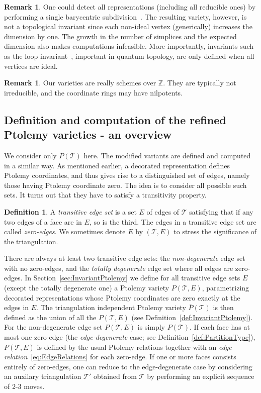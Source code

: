 \documentclass[11pt]{amsart}
\theoremstyle{plain}
\theoremstyle{definition}
\newtheorem{definition}[theorem]{Definition}
\newtheorem{remark}[theorem]{Remark}
\numberwithin{equation}{section}
\newcommand{\Z}{\mathbb Z}
\newcommand{\T}{\mathcal T}
\begin{document}
\begin{remark}
One could detect all representations (including all reducible ones) by performing a single barycentric subdivision~\cite{GaroufalidisThurstonZickert}. The resulting variety, however, is not a topological invariant since each non-ideal vertex (generically) increases the dimension by one. The growth in the number of simplices and the expected dimension also makes computations infeasible. More importantly, invariants such as the loop invariant~\cite{DG}, important in quantum topology, are only defined when all vertices are ideal.
\end{remark}

\begin{remark}
Our varieties are really schemes over $\Z$. They are typically not irreducible, and the coordinate rings may have nilpotents.
\end{remark}


\subsection{Definition and computation of the refined Ptolemy varieties - an overview}\label{sec:Algorithm}
We consider only $\overline P(\T)$ here. The modified variants are defined and computed in a similar way.
As mentioned earlier, a decorated representation defines Ptolemy coordinates, and thus gives rise to a distinguished set of edges, namely those having Ptolemy coordinate zero. The idea is to consider all possible such sets. It turns out that they have to satisfy a transitivity property.

\begin{definition} A \emph{transitive edge set} is a set $E$ of edges of $\T$ satisfying that if any two edges of a face are in $E$, so is the third. The edges in a transitive edge set are called \emph{zero-edges}. We sometimes denote $E$ by $(\T,E)$ to stress the significance of the triangulation.
\end{definition}

There are always at least two transitive edge sets: the \emph{non-degenerate} edge set with no zero-edges, and the \emph{totally degenerate} edge set where all edges are zero-edges. In Section~\ref{sec:InvariantPtolemy} we define for all transitive edge sets $E$ (except the totally degenerate one) a Ptolemy variety $P(\T,E)$, parametrizing decorated representations whose Ptolemy coordinates are zero exactly at the edges in $E$.
The triangulation independent Ptolemy variety $\overline P(\T)$ is then defined as the union of all the $P(\T,E)$ (see Definition~\ref{def:InvariantPtolemy}). For the non-degenerate edge set $P(\T,E)$ is simply $P(\T)$. If each face has at most one zero-edge (the \emph{edge-degenerate} case; see Definition~\ref{def:PartitionType}), $P(\T,E)$ is defined by the usual Ptolemy relations together with an \emph{edge relation}~\eqref{eq:EdgeRelations} for each zero-edge.
If one or more faces consists entirely of zero-edges, one can reduce to the edge-degenerate case by considering an auxilary triangulation $\T'$ obtained from $\T$ by performing an explicit sequence of 2-3 moves.
\end{document}
